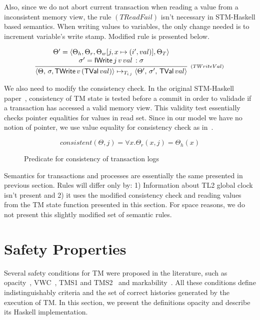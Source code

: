 \documentclass[sigplan]{acmart}
\theoremstyle{definition}
\newcommand{\C}[1]{\red{\mathsf{#1}}}
\begin{document}
Also, since we do not abort current transaction when reading a value from a inconsistent
memory view, the rule $(TReadFail)$ isn't necessary in STM-Haskell based semantics. When writing
values to variables, the only change needed is to increment variable's write stamp.
Modified rule is presented below.

\[
  \begin{array}{l}
  \infer[_{(TWriteVal)}]
        { \langle \Theta, \, \sigma, \ensuremath{\C{TWrite}}\,v\,(\ensuremath{\C{TVal}}\,val)\rangle \mapsto_{T_{i\,j}}
          \langle \Theta', \, \sigma',\,\ensuremath{\C{TVal}}\,val\rangle}
        {\begin{array}{c}
            \Theta' = \langle \Theta_h, \Theta_r, \Theta_w[j,x \mapsto (i',val)], \Theta_T\rangle \\
            \sigma' = \ensuremath{\C{IWrite}}\,j\,v\,val\, : \sigma \\
         \end{array}}
  \end{array}
\]


We also need to modify the consistency check. In the original STM-Haskell paper~\cite{Harris05}, consistency
of TM state is tested before a commit in order to validade if a transaction has accessed a valid memory view.
This validity test essentially checks pointer equalities for values in read set. Since in our model we have no
notion of pointer, we use value equality for consistency check as in~\cite{Hu08}.
\begin{figure}[h]
  \[
     consistent(\Theta,j) = \forall x. \Theta_r(x,j) = \Theta_h(x)
  \]
  \centering
  \caption{Predicate for consistency of transaction logs}
  \label{fig:consistency1}
\end{figure}

Semantics for transactions and processes are essentially the same presented in previous section. Rules will
differ only by: 1) Information about TL2 global clock isn't present and 2) it uses the modified consistency
check and reading values from the TM state function presented in this section. For space reasons, we do not
present this slightly modified set of semantic rules.

\section{Safety Properties}\label{sec:stm-safety}

Several safety conditions for TM were proposed in the literature, such as opacity~\cite{Guerraoui2008},
VWC~\cite{Imbs2009}, TMS1 and TMS2~\cite{Doherty2009} and markability~\cite{LesaniP14}. All these conditions define
indistinguishably criteria and the set of correct histories generated by the execution of TM. In this section, we
present the definitions opacity and describe its Haskell implementation.
\end{document}
